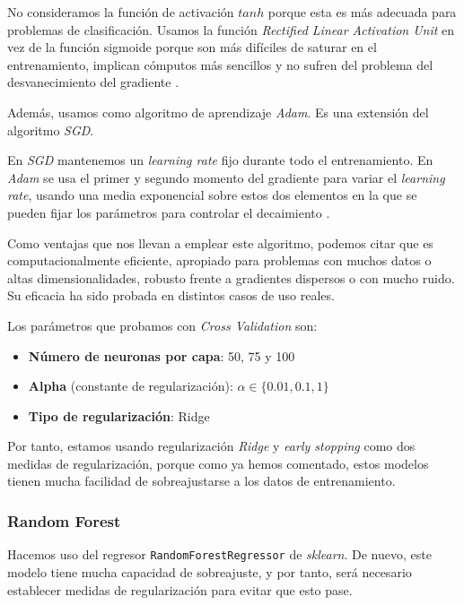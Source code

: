 \documentclass[11pt]{article}
\begin{document}
No consideramos la función de activación $tanh$ porque esta es más adecuada para problemas de clasificación. Usamos la función \emph{Rectified Linear Activation Unit} en vez de la función sigmoide porque son más difíciles de saturar en el entrenamiento, implican cómputos más sencillos y no sufren del problema del desvanecimiento del gradiente \cite{relu:online}.

Además, usamos como algoritmo de aprendizaje \emph{Adam}. Es una extensión del algoritmo \emph{SGD}.

En \emph{SGD} mantenemos un \emph{learning rate} fijo durante todo el entrenamiento. En \emph{Adam} se usa el primer y segundo momento del gradiente para variar el \emph{learning rate}, usando una media exponencial sobre estos dos elementos en la que se pueden fijar los parámetros para controlar el decaimiento \cite{adam:online}.

Como ventajas que nos llevan a emplear este algoritmo, podemos citar que es computacionalmente eficiente, apropiado para problemas con muchos datos o altas dimensionalidades, robusto frente a gradientes dispersos o con mucho ruido. Su eficacia ha sido probada en distintos casos de uso reales.

Los parámetros que probamos con \emph{Cross Validation} son:

\begin{itemize}
  \item \textbf{Número de neuronas por capa}: 50, 75 y 100
  \item \textbf{Alpha} (constante de regularización): $\alpha \in \{0.01, 0.1, 1\}$
  \item \textbf{Tipo de regularización}: Ridge
\end{itemize}

Por tanto, estamos usando regularización \emph{Ridge} y \emph{early stopping} como dos medidas de regularización, porque como ya hemos comentado, estos modelos tienen mucha facilidad de sobreajustarse a los datos de entrenamiento.

\subsubsection{Random Forest} \label{random_forest}

Hacemos uso del regresor \lstinline{RandomForestRegressor} de \emph{sklearn}. De nuevo, este modelo tiene mucha capacidad de sobreajuste, y por tanto, será necesario establecer medidas de regularización para evitar que esto pase.
\end{document}
